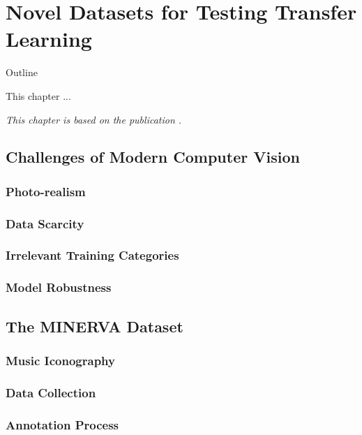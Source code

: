 \chapter{Novel Datasets for Testing Transfer Learning}

\begin{remark}{Outline}

This chapter ...

\vspace{5mm}
\textit{This chapter is based on the publication \citet{sabatelli2021advances}.}
\label{ch:minerva_paper}


\end{remark}


\section{Challenges of Modern Computer Vision}
\label{sec:cv_challenges}


\subsection{Photo-realism}
\subsection{Data Scarcity}
\subsection{Irrelevant Training Categories}
\subsection{Model Robustness}



\section{The MINERVA Dataset}
\label{sec:minerva_dataset}

\subsection{Music Iconography}
\subsection{Data Collection}
\subsection{Annotation Process}
